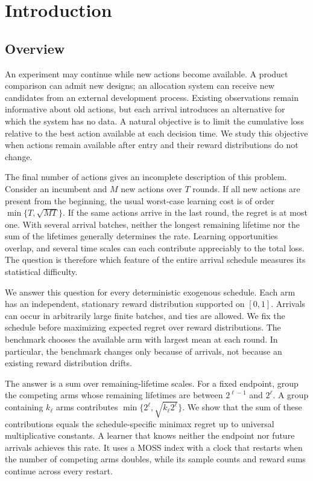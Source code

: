 \section{Introduction}
\subsection{Overview}
An experiment may continue while new actions become available. A product comparison can admit new designs; an allocation system can receive new candidates from an external development process. Existing observations remain informative about old actions, but each arrival introduces an alternative for which the system has no data. A natural objective is to limit the cumulative loss relative to the best action available at each decision time. We study this objective when actions remain available after entry and their reward distributions do not change.

The final number of actions gives an incomplete description of this problem. Consider an incumbent and $M$ new actions over $T$ rounds. If all new actions are present from the beginning, the usual worst-case learning cost is of order $\min\{T,\sqrt{MT}\}$. If the same actions arrive in the last round, the regret is at most one. With several arrival batches, neither the longest remaining lifetime nor the sum of the lifetimes generally determines the rate. Learning opportunities overlap, and several time scales can each contribute appreciably to the total loss. The question is therefore which feature of the entire arrival schedule measures its statistical difficulty.

We answer this question for every deterministic exogenous schedule. Each arm has an independent, stationary reward distribution supported on $[0,1]$. Arrivals can occur in arbitrarily large finite batches, and ties are allowed. We fix the schedule before maximizing expected regret over reward distributions. The benchmark chooses the available arm with largest mean at each round. In particular, the benchmark changes only because of arrivals, not because an existing reward distribution drifts.

The answer is a sum over remaining-lifetime scales. For a fixed endpoint, group the competing arms whose remaining lifetimes are between $2^{\ell-1}$ and $2^\ell$. A group containing $k_\ell$ arms contributes $\min\{2^\ell,\sqrt{k_\ell2^\ell}\}$. We show that the sum of these contributions equals the schedule-specific minimax regret up to universal multiplicative constants. A learner that knows neither the endpoint nor future arrivals achieves this rate. It uses a MOSS index with a clock that restarts when the number of competing arms doubles, while its sample counts and reward sums continue across every restart.


